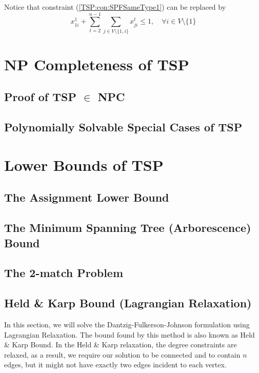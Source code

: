 					Notice that constraint (\ref{TSP:con:SPFSameType1}) can be replaced by
					\begin{equation}
						x_{1i}^1 + \sum_{t = 2}^{n - 1}\sum_{j \in V \setminus \{1, i\}} x_{ji}^t \le 1, \quad \forall i \in V \setminus \{1\} \label{TSP:con:SPFSameType2}
					\end{equation}

			\section{NP Completeness of TSP}
				\subsection{Proof of TSP $\in$ NPC}

				\subsection{Polynomially Solvable Special Cases of TSP}

			\section{Lower Bounds of TSP}
				\subsection{The Assignment Lower Bound}

				\subsection{The Minimum Spanning Tree (Arborescence) Bound}

				\subsection{The 2-match Problem}

				\subsection{Held \& Karp Bound (Lagrangian Relaxation)}
					In this section, we will solve the Dantzig-Fulkerson-Johnson formulation using Lagrangian Relaxation. The bound found by this method is also known as Held \& Karp Bound. In the Held \& Karp relaxation, the degree constraints are relaxed, as a result, we require our solution to be connected and to contain $n$ edges, but it might not have exactly two edges incident to each vertex.

